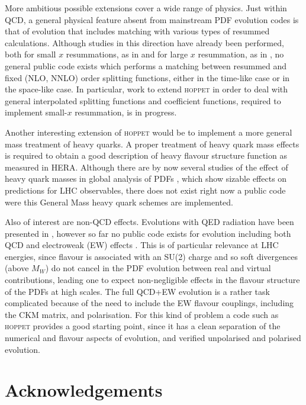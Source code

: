 \documentclass[12pt]{article}
\newcommand{\hoppet}{\textsc{hoppet}\xspace}
\begin{document}
More ambitious possible extensions cover a wide range of physics.
Just within QCD, a general physical feature absent from mainstream PDF
evolution codes is that of evolution that includes matching with
various types of resummed calculations. Although studies in this direction
have already been performed, both for small $x$ resummations, 
as in \cite{White:2005wm}
 and for large $x$ resummation, as in \cite{Corcella:2005us},
no general public code exists which performs a matching between
resummed 
 and fixed (NLO, NNLO) order
splitting functions, either in the time-like case or in
the space-like case. In particular, work to extend
\hoppet in order to deal with general interpolated
splitting functions and coefficient functions, required
to implement small-$x$ resummation, is in progress.

Another interesting extension of \hoppet would be to
implement a more general mass treatment of heavy quarks.
A proper treatment of heavy quark mass effects is required to
obtain a good description of heavy flavour structure function
as measured in HERA. Although there are by now several studies
of the effect of heavy quark masses in global analysis
of PDFs \cite{Martin:2007bv,Tung:2006tb},
 which show sizable effects on predictions for
LHC observables, there does not exist right now a public code
were this General Mass heavy quark schemes are implemented.

Also of interest are non-QCD effects. Evolutions with QED radiation
have been presented in \cite{Weinzierl:2002mv,Martin:2004dh}, 
however so far no public code
exists for evolution including both QCD and electroweak (EW) effects
\cite{Ciafaloni:2000df,Ciafaloni:2005fm}.
This is of particular relevance at LHC energies, since flavour is
associated with an SU(2) charge and so soft divergences (above $M_W$)
do not cancel in the PDF evolution between real and virtual
contributions, leading one to expect
non-negligible effects in the flavour structure of the PDFs at high
scales.
%
The full QCD+EW evolution is a rather task complicated because of the
need to include the EW flavour couplings, including the CKM matrix,
and polarisation. For this kind of problem a code such as \hoppet
provides a good starting point, since it has a clean separation of the
numerical and flavour aspects of evolution, and verified unpolarised
and polarised evolution.


\section*{Acknowledgements}
\end{document}
